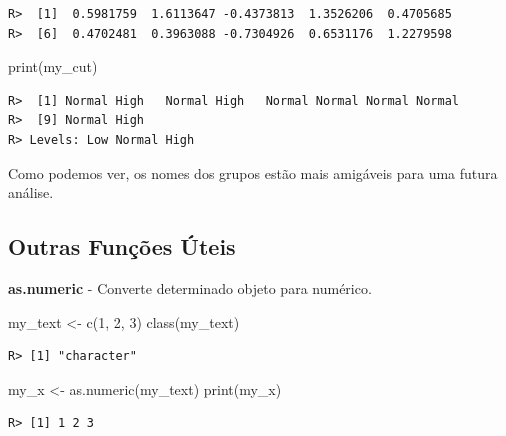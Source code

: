 \documentclass[
  11pt,
]{book}
\newenvironment{Shaded}{\begin{snugshade}}{\end{snugshade}}
\newcommand{\FunctionTok}[1]{\textcolor[rgb]{0,0,0}{#1}}
\newcommand{\NormalTok}[1]{#1}
\newcommand{\OtherTok}[1]{\textcolor[rgb]{0.37,0.37,0.37}{#1}}
\newcommand{\StringTok}[1]{\textcolor[rgb]{0.5,0.5,0.5}{#1}}
\begin{document}
\begin{verbatim}
R>  [1]  0.5981759  1.6113647 -0.4373813  1.3526206  0.4705685
R>  [6]  0.4702481  0.3963088 -0.7304926  0.6531176  1.2279598
\end{verbatim}

\begin{Shaded}
\begin{Highlighting}[]
\FunctionTok{print}\NormalTok{(my\_cut)}
\end{Highlighting}
\end{Shaded}

\begin{verbatim}
R>  [1] Normal High   Normal High   Normal Normal Normal Normal
R>  [9] Normal High  
R> Levels: Low Normal High
\end{verbatim}

Como podemos ver, os nomes dos grupos estão mais amigáveis para uma futura análise.

\hypertarget{outras-funuxe7uxf5es-uxfateis-3}{%
\subsection{Outras Funções Úteis}\label{outras-funuxe7uxf5es-uxfateis-3}}

\textbf{as.numeric} - Converte determinado objeto para numérico.

\begin{Shaded}
\begin{Highlighting}[]
\NormalTok{my\_text }\OtherTok{\textless{}{-}} \FunctionTok{c}\NormalTok{(}\StringTok{\textquotesingle{}1\textquotesingle{}}\NormalTok{, }\StringTok{\textquotesingle{}2\textquotesingle{}}\NormalTok{, }\StringTok{\textquotesingle{}3\textquotesingle{}}\NormalTok{)}
\FunctionTok{class}\NormalTok{(my\_text)}
\end{Highlighting}
\end{Shaded}

\begin{verbatim}
R> [1] "character"
\end{verbatim}

\begin{Shaded}
\begin{Highlighting}[]
\NormalTok{my\_x }\OtherTok{\textless{}{-}} \FunctionTok{as.numeric}\NormalTok{(my\_text)}
\FunctionTok{print}\NormalTok{(my\_x)}
\end{Highlighting}
\end{Shaded}

\begin{verbatim}
R> [1] 1 2 3
\end{verbatim}
\end{document}
